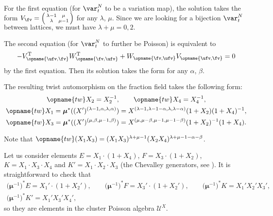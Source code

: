\documentclass[pdftex]{sigma}
\renewcommand{\tw}{\opname{tw}}
\newcommand{\XClAlg}{\mathcal{U}^X}
\newcommand{\seq}{\boldsymbol{\mu}}%
\renewcommand{\tw}{\opname{tw}}
\newcommand{\high}{\opname{\ufv,\fv}}
\newcommand{\low}{\opname{\fv,\ufv}}
\numberwithin{equation}{section}
\begin{document}
\begin{Example}
For the first equation (for $\var_{t}^{N}$ to be a variation map),
the solution takes the form $V_{\fv}=\smash{\left(\begin{smallmatrix}
\lambda-1 & \mu\\
\lambda & \mu-1
\end{smallmatrix}\right)}$ for any $\lambda$, $\mu$. Since we are looking for a bijection $\var_{t}^{N}$
between lattices, we must have $\lambda+\mu=0,2$.

The second equation (for $\var_{t}^{N}$ to further be Poisson) is
equivalent to \[-V_{\high}^{\rm T}W_{\low}^{\rm T}+W_{\low}V_{\high}=0\] by
the first equation. Then its solution takes the form \smash{$V_{\high}=\left(\begin{smallmatrix}
\alpha & \beta\\
\alpha & \beta
\end{smallmatrix}\right)$} for any $\alpha$, $\beta$.

The resulting twist automorphism on the fraction field takes the following
form:
\begin{gather*}
\tw X_{2} =X_{2}^{-1},\qquad
\tw X_{4} =X_{4}^{-1},\\
\tw X_{1} =\seq^{*}((X')^{(\lambda-1,\alpha,\lambda,\alpha)})=X^{(\lambda-1,\lambda-1-\alpha,\lambda,\lambda-\alpha)}(1+X_{2})(1+X_{4})^{-1},\\
\tw X_{3} =\seq^{*}((X')^{(\mu,\beta,\mu-1,\beta)})=X^{(\mu,\mu-\beta,\mu-1,\mu-1-\beta)}(1+X_{2})^{-1}(1+X_{4}).
\end{gather*}

Note that $\tw(X_{1}X_{3})=(X_{1}X_{3})^{\lambda+\mu-1}(X_{2}X_{4})^{\lambda+\mu-1-\alpha-\beta}$.

Let us consider elements $E=X_{1}\cdot(1+X_{4})$, $F=X_{3}\cdot(1+X_{2})$,
$K=X_{1}\cdot X_{3}\cdot X_{4}$ and $K'=X_{1}\cdot X_{2}\cdot X_{3}$
(the Chevalley generators, see \cite{schrader2019cluster}). It is
straightforward to check that
\begin{gather*}
\big(\seq^{-1}\big)^{*}E=X_{1}'\cdot(1+X_{2}'),\qquad \big(\seq^{-1}\big)^{*}F=X_{3}'\cdot(1+X_{2}'), \qquad\big(\seq^{-1}\big)^{*}K=X_{1}'X_{2}'X_{3}',\\
\big(\seq^{-1}\big)^{*}K'=X_{1}'X_{3}'X_{4}',
\end{gather*}
 so they are elements in the
cluster Poisson algebra $\XClAlg$.


\end{Example}
\end{document}
